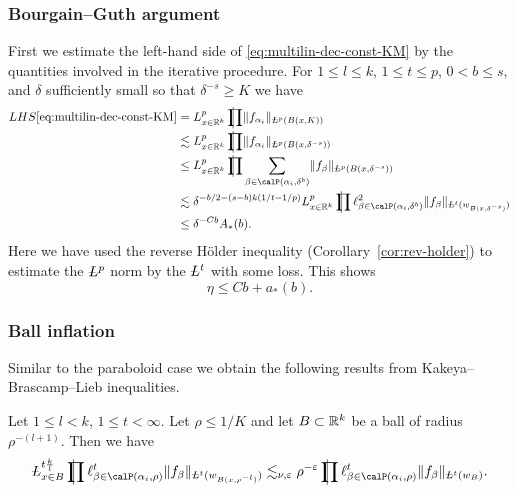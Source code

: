 \subsubsection{Bourgain--Guth argument}
First we estimate the left-hand side of \eqref{eq:multilin-dec-const-KM} by the quantities involved in the iterative procedure.
For $1 \leq l \leq k$, $1 \leq t \leq p$, $0<b \leq s$, and $\delta$ sufficiently small so that $\delta^{-s}\geq K$ we have
\begin{equation}
\label{eq:multlin<A}
\begin{split}
LHS\eqref{eq:multilin-dec-const-KM}
&=
L^{p}_{x\in \R^{k}} \avprod \norm{ f_{\alpha_{i}} }_{\avL^{p}(B(x,K))}
\\ &\lesssim
L^{p}_{x\in \R^{k}} \avprod \norm{ f_{\alpha_{i}} }_{\avL^{p}(B(x,\delta^{-s}))}
\\ &\leq
L^{p}_{x\in \R^{k}} \avprod \sum_{\beta \in \Part[\alpha_{i}]{\delta^{b}}} \norm{ f_{\beta} }_{\avL^{p}(B(x,\delta^{-s}))}
\\ &\lesssim
\delta^{-b/2-(s-b)k(1/t-1/p)} L^{p}_{x\in \R^{k}} \avprod \ell^{2}_{\beta \in \Part[\alpha_{i}]{\delta^{b}}} \norm{ f_{\beta} }_{\avL^{t}(w_{B(x,\delta^{-s})})}
\\ &\leq
\delta^{-Cb} A_{*}(b).
\end{split}
\end{equation}
Here we have used the reverse H\"older inequality (Corollary~\ref{cor:rev-holder}) to estimate the $\avL^{p}$ norm by the $\avL^{t}$ with some loss.
This shows
\begin{equation}
\label{eq:a*:BG}
\eta \leq Cb + a_{*}(b).
\end{equation}

\subsubsection{Ball inflation}
Similar to the paraboloid case we obtain the following results from Kakeya--Brascamp--Lieb inequalities.

\begin{lemma}
\label{lem:ball-inflation}
Let $1\le l < k$, $1 \leq t < \infty$.
Let $\rho \leq 1/K$ and let $B \subset \mathbb{R}^{k}$ be a ball of radius $\rho^{-(l+1)}$.
Then we have
\begin{equation}
\label{eq:ball-inflation}
\avL^{t \frac{k}{l}}_{x\in B} \avprod \ell^{t}_{\beta \in \Part[\alpha_i]{ \rho}} \norm{f_{\beta}}_{\avL^{t}(w_{B(x,\rho^{-l})})}
\lesssim_{\nu,\epsilon} \rho^{-\epsilon}
\avprod \ell^{t}_{\beta \in \Part[\alpha_i]{\rho}} \norm{ f_{\beta} }_{\avL^{t}(w_B)}.
\end{equation}
\end{lemma}


